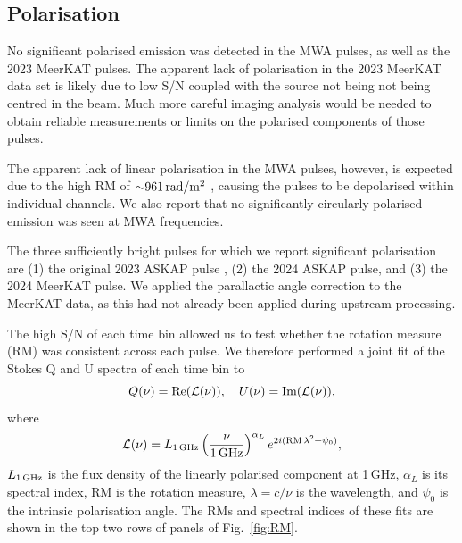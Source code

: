 \documentclass[fleqn,usenatbib]{mnras}
\newcommand{\Fig}{Fig.}
\begin{document}

\subsection{Polarisation} \label{sec:polarisation}

No significant polarised emission was detected in the MWA pulses, as well as the 2023 MeerKAT pulses.
The apparent lack of polarisation in the 2023 MeerKAT data set is likely due to low S/N coupled with the source not being not being centred in the beam.
Much more careful imaging analysis would be needed to obtain reliable measurements or limits on the polarised components of those pulses.

The apparent lack of linear polarisation in the MWA pulses, however, is expected due to the high RM of ${\sim}961\,{\rm rad}/{\rm m}^2$ , causing the pulses to be depolarised within individual channels.
We also report that no significantly circularly polarised emission was seen at MWA frequencies.

The three sufficiently bright pulses for which we report significant polarisation are (1) the original 2023 ASKAP pulse , (2) the 2024 ASKAP pulse, and (3) the 2024 MeerKAT pulse.
We applied the parallactic angle correction to the MeerKAT data, as this had not already been applied during upstream processing.

The high S/N of each time bin allowed us to test whether the rotation measure (RM) was consistent across each pulse.
We therefore performed a joint fit of the Stokes Q and U spectra of each time bin to
\begin{equation}
    Q(\nu) = {\rm Re}(\mathcal{L}(\nu)),
    \quad
    U(\nu) = {\rm Im}(\mathcal{L}(\nu)),
    \label{eqn:RM}
\end{equation}
where
\begin{equation}
    \mathcal{L}(\nu)
        = L_{\rm 1\,GHz}\left(\frac{\nu}{\rm 1\,GHz}\right)^{\alpha_L} e^{2i({\rm RM}\,\lambda^2 + \psi_0)},
\end{equation}
$L_{\rm 1\,GHz}$ is the flux density of the linearly polarised component at 1\,GHz, $\alpha_L$ is its spectral index, RM is the rotation measure, $\lambda = c/\nu$ is the wavelength, and $\psi_0$ is the intrinsic polarisation angle.
The RMs and spectral indices of these fits are shown in the top two rows of panels of \Fig~\ref{fig:RM}.
\end{document}
